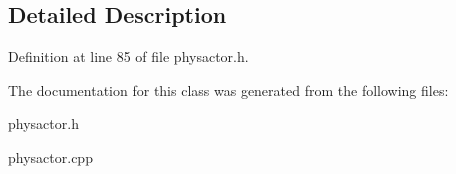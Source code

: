 \subsection{Detailed Description}


Definition at line 85 of file physactor.h.

The documentation for this class was generated from the following files:\begin{DoxyCompactItemize}
\item 
physactor.h\item 
physactor.cpp\end{DoxyCompactItemize}
